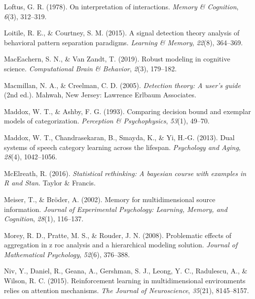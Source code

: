 \documentclass[
  english,
  ,man,floatsintext]{apa6}
\begin{document}
\leavevmode\hypertarget{ref-Loftus1978}{}%
Loftus, G. R. (1978). On interpretation of interactions. \emph{Memory \& Cognition}, \emph{6}(3), 312--319.

\leavevmode\hypertarget{ref-LoitileAndCourtney2015}{}%
Loitile, R. E., \& Courtney, S. M. (2015). A signal detection theory analysis of behavioral pattern separation paradigms. \emph{Learning \& Memory}, \emph{22}(8), 364--369.

\leavevmode\hypertarget{ref-MacEachernAndVanZandt2019}{}%
MacEachern, S. N., \& Van Zandt, T. (2019). Robust modeling in cognitive science. \emph{Computational Brain \& Behavior}, \emph{2}(3), 179--182.

\leavevmode\hypertarget{ref-MacmillanAndCreelman2005}{}%
Macmillan, N. A., \& Creelman, C. D. (2005). \emph{Detection theory: A user's guide} (2nd ed.). Mahwah, New Jersey: Lawrence Erlbaum Associates.

\leavevmode\hypertarget{ref-MaddoxAndAshby1993}{}%
Maddox, W. T., \& Ashby, F. G. (1993). Comparing decision bound and exemplar models of categorization. \emph{Perception \& Psychophysics}, \emph{53}(1), 49--70.

\leavevmode\hypertarget{ref-MaddoxEtAl2013}{}%
Maddox, W. T., Chandrasekaran, B., Smayda, K., \& Yi, H.-G. (2013). Dual systems of speech category learning across the lifespan. \emph{Psychology and Aging}, \emph{28}(4), 1042--1056.

\leavevmode\hypertarget{ref-McElreath2016}{}%
McElreath, R. (2016). \emph{Statistical rethinking: A bayesian course with examples in R and Stan}. Taylor \& Francis.

\leavevmode\hypertarget{ref-MeiserAndBroder2002}{}%
Meiser, T., \& Bröder, A. (2002). Memory for multidimensional source information. \emph{Journal of Experimental Psychology: Learning, Memory, and Cognition}, \emph{28}(1), 116--137.

\leavevmode\hypertarget{ref-morey2008problematic}{}%
Morey, R. D., Pratte, M. S., \& Rouder, J. N. (2008). Problematic effects of aggregation in z roc analysis and a hierarchical modeling solution. \emph{Journal of Mathematical Psychology}, \emph{52}(6), 376--388.

\leavevmode\hypertarget{ref-NivEtAl2015}{}%
Niv, Y., Daniel, R., Geana, A., Gershman, S. J., Leong, Y. C., Radulescu, A., \& Wilson, R. C. (2015). Reinforcement learning in multidimensional environments relies on attention mechanisms. \emph{The Journal of Neuroscience}, \emph{35}(21), 8145--8157.
\end{document}
